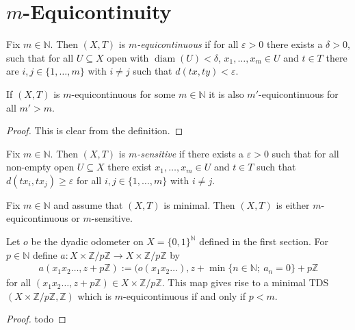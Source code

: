 \section{$m$-Equicontinuity}

\begin{definition}[$m$-Equicontinuity]
	Fix $m \in \mathbb{N}$. Then $(X, T)$ is \emph{$m$-equicontinuous} if for all $\varepsilon > 0$ there exists a $\delta > 0$, such that for all $U \subseteq X$ open with $\operatorname{diam}(U) < \delta$, $x_1, \dots, x_m \in U$ and $t \in T$ there are $i, j \in \{1, \dots, m\}$ with $i \neq j$ such that $d(tx, ty) < \varepsilon$.
\end{definition}

\begin{proposition}
	If $(X, T)$ is $m$-equicontinuous for some $m \in \mathbb{N}$ it is also $m'$-equicontinuous for all $m' > m$.
\end{proposition}
\begin{proof}
	This is clear from the definition.
\end{proof}

\begin{definition}[$m$-Sensitivity]
	Fix $m \in \mathbb{N}$. Then $(X, T)$ is \emph{$m$-sensitive} if there exists a $\varepsilon > 0$ such that for all non-empty open $U \subseteq X$ there exist $x_1, \dots, x_m \in U$ and $t \in T$ such that $d(tx_i, tx_j) \geq \varepsilon$ for all $i, j \in \{1, \dots, m\}$ with $i \neq j$.
\end{definition}

\begin{theorem}
	Fix $m \in \mathbb{N}$ and assume that $(X, T)$ is minimal. Then $(X, T)$ is either $m$-equicontinuous or $m$-sensitive.
\end{theorem}


\begin{example}
	Let $o$ be the dyadic odometer on $X = \{0, 1\}^\mathbb{N}$ defined in the first section. For $p \in \mathbb{N}$ define $a: X \times \mathbb{Z}/p\mathbb{Z} \to X \times \mathbb{Z}/p\mathbb{Z}$ by
	\begin{align*}
		a(x_1x_2\dots, z + p\mathbb{Z}) := (o(x_1x_2\dots), z + \min \{n \in \mathbb{N};\ a_n = 0\} + p\mathbb{Z}
	\end{align*}
	for all $(x_1x_2\dots, z + p\mathbb{Z}) \in X \times \mathbb{Z}/p\mathbb{Z}$. This map gives rise to a minimal TDS $(X \times \mathbb{Z}/p\mathbb{Z}, \mathbb{Z})$ which is $m$-equicontinuous if and only if $p < m$.
\end{example}
\begin{proof}
	todo
\end{proof}

